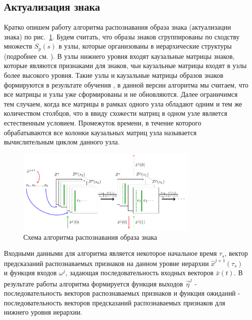 \documentclass[12pt]{scrartcl}
\begin{document}
	\subsection{Актуализация знака}
	
	Кратко опишем работу алгоритма распознавания образа знака (актуализации знака) по рис.~\ref{fig:percept}. Будем считать, что образы знаков сгруппированы по сходству множеств $S_p(s)$ в узлы, которые организованы в иерархические структуры (подробнее см. \cite{Panov2014d}). В узлы нижнего уровня входят каузальные матрицы знаков, которые являются признаками для знаков, чьи каузальные матрицы входят в узлы более высокого уровня. Такие узлы и каузальные матрицы образов знаков формируются в результате обучения \cite{Panov2014d,Skrynnik2016}, в данной версии алгоритма мы считаем, что все матрицы и узлы уже сформированы и не обновляются. Далее ограничимся тем случаем, когда все матрицы в рамках одного узла обладают одним и тем же количеством столбцов, что в ввиду схожести матриц в одном узле является естественным условием. Промежуток времени, в течение которого обрабатываются все колонки каузальных матриц узла называется вычислительным циклом данного узла.
	
	\begin{figure}
		\centering
		\includegraphics[width=0.8\textwidth]{algo/perception}
		\caption{Схема алгоритма распознавания образа знака}
		\label{fig:percept}		
	\end{figure}

	\linespread{1}
	\begin{algorithm}[H]
		\label{alg:automato}
		\begin{algorithmic}[1]
			
		\end{algorithmic}
	\end{algorithm}
	\linespread{2}

	Входными данными для алгоритма является некоторое начальное время $\tau_s$, вектор предсказаний распознаваемых признаков на данном уровне иерархии $\hat x^{j+1}(\tau_s)$ и функция входов $\omega^j$, задающая последовательность входных векторов $\bar x(t)$. В результате работы алгоритма формируется функция выходов $\vec \eta^j$ - последовательность векторов распознаваемых признаков и функция ожиданий - последовательность векторов предсказаний распознаваемых признаков для нижнего уровня иерархии.
	
\end{document}

